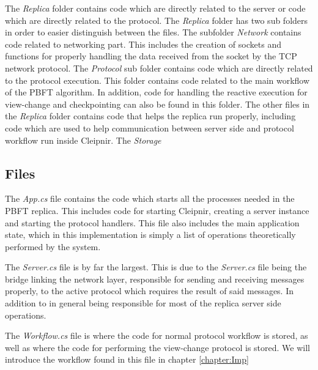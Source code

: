 The \emph{Replica} folder contains code which are directly related to the server or code which are directly related to the protocol. The \emph{Replica} folder has two sub folders in order to easier distinguish between the files. The subfolder \emph{Network} contains code related to networking part. This includes the creation of sockets and functions for properly handling the data received from the socket by the TCP network protocol. 
The \emph{Protocol} sub folder contains code which are directly related to the protocol execution. This folder contains code related to the main workflow of the PBFT algorithm. In addition, code for handling the reactive execution for view-change and checkpointing can also be found in this folder.
The other files in the \emph{Replica} folder contains code that helps the replica run properly, including code which are used to help communication between server side and protocol workflow run inside Cleipnir.
The \emph{Storage} 

\subsection{Files}
The \emph{App.cs} file contains the code which starts all the processes needed in the PBFT replica. This includes code for starting Cleipnir, creating a server instance and starting the protocol handlers. This file also includes the main application state, which in this implementation is simply a list of operations theoretically performed by the system.

The \emph{Server.cs} file is by far the largest. This is due to the \emph{Server.cs} file being the bridge linking the network layer, responsible for sending and receiving messages properly, to the active protocol which requires the result of said messages. In addition to in general being responsible for most of the replica server side operations. 

The \emph{Workflow.cs} file is where the code for normal protocol workflow is stored, as well as where the code for performing the view-change protocol is stored. We will introduce the workflow found in this file in chapter \autoref{chapter:Imp}
%

